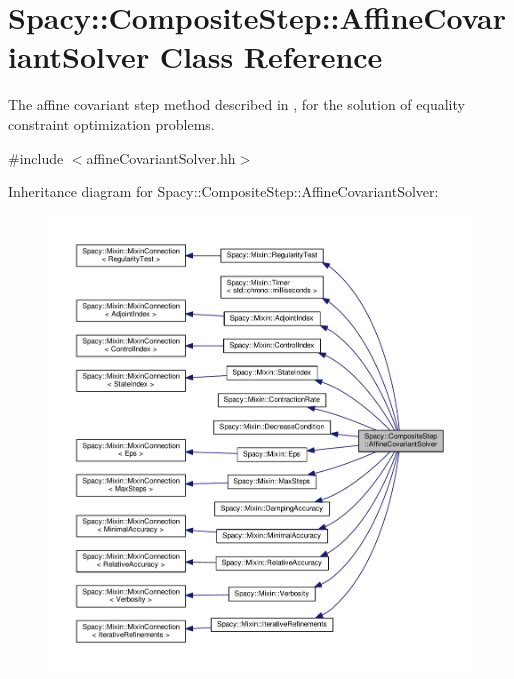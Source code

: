\hypertarget{classSpacy_1_1CompositeStep_1_1AffineCovariantSolver}{}\section{Spacy\+:\+:Composite\+Step\+:\+:Affine\+Covariant\+Solver Class Reference}
\label{classSpacy_1_1CompositeStep_1_1AffineCovariantSolver}


The affine covariant step method described in \cite{Lubkoll2015}, \cite{Lubkoll2015a} for the solution of equality constraint optimization problems.  




{\ttfamily \#include $<$affine\+Covariant\+Solver.\+hh$>$}



Inheritance diagram for Spacy\+:\+:Composite\+Step\+:\+:Affine\+Covariant\+Solver\+:\nopagebreak
\begin{figure}[H]
\begin{center}
\leavevmode
\includegraphics[width=350pt]{classSpacy_1_1CompositeStep_1_1AffineCovariantSolver__inherit__graph}
\end{center}
\end{figure}


